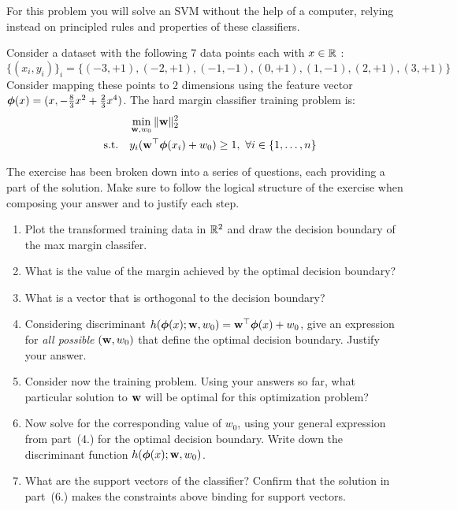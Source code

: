 \documentclass[submit]{harvardml}
\begin{document}
\newpage
\begin{problem}
  For this problem you will solve an SVM without the help of a
  computer, relying instead on principled rules and properties of
  these classifiers.

Consider a dataset with the following 7 data points each with $x \in \mathbb{R}$ : \[\{(x_i, y_i)\}_i =\{(-3 , +1) , (-2 , +1 ) , (-1,  -1 ), (0, +1), ( 1 , -1 ), ( 2 , +1 ) , ( 3 , +1 )\}\] Consider
mapping these points to $2$ dimensions using the feature vector $\boldsymbol{\phi}(x) =  (x, -\frac{8}{3}x^2 + \frac{2}{3}x^4 )$. The hard margin classifier training problem is:
%
\begin{align*}
  &\min_{\mathbf{w}, w_0} \|\mathbf{w}\|_2^2 \label{eq:dcp} \\
  \quad \text{s.t.} \quad & y_i(\mathbf{w}^\top \boldsymbol{\phi}(x_i) + w_0) \geq 1,~\forall i \in \{1,\ldots, n\}\notag
\end{align*}

The exercise has been broken down into a series of questions, each
providing a part of the solution. Make sure to follow the logical structure of
the exercise when composing your answer and to justify each step.

\begin{enumerate}
\item Plot the transformed training data in $\mathbb{R}^2$ and draw the decision boundary
of the max margin classifer.
%
\item  What is the value of the margin achieved by the optimal
decision boundary? 
%
\item What is a vector that is orthogonal to the decision boundary?

%
\item Considering discriminant $h(\boldsymbol{\phi}(x);\mathbf{w},w_0)=\mathbf{w}^\top\boldsymbol{\phi}(x) +w_0$, 
give an expression for {\em all possible} $(\mathbf{w},w_0)$ that define
the optimal decision boundary. Justify your answer.

  \item Consider now the training problem. Using your answers so far,
    what particular solution to $\mathbf{w}$ will be optimal for this
    optimization problem?

  \item Now solve for the corresponding value of $w_0$, using your
    general expression from part~(4.) for the optimal decision
    boundary.  Write down the discriminant function
    $h(\boldsymbol{\phi}(x);\mathbf{w},w_0)$.


\item What are the support vectors of the classifier?  Confirm that
  the solution in part~(6.) makes the constraints above binding for
  support vectors.

\end{enumerate}

\end{problem}
\end{document}
